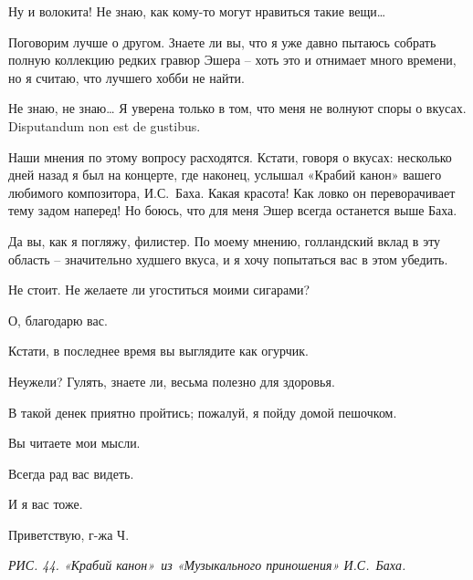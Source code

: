 \documentclass[../main.tex]{subfiles}
\begin{document}
\begin{dialogue}
 Ну и волокита! Не знаю, как кому-то могут нравиться такие вещи\ldots{}

 Поговорим лучше о другом. Знаете ли вы, что я уже давно пытаюсь собрать полную коллекцию редких гравюр Эшера \--- хоть это и отнимает много времени, но я считаю, что лучшего хобби не найти.

 Не знаю, не знаю\ldots{} Я уверена только в том, что меня не волнуют споры о вкусах. Disputandum non est de gustibus.

 Наши мнения по этому вопросу расходятся. Кстати, говоря о вкусах: несколько дней назад я был на концерте, где наконец, услышал «Крабий канон» вашего любимого композитора, И.С.~Баха. Какая красота! Как ловко он переворачивает тему задом наперед! Но боюсь, что для меня Эшер всегда останется выше Баха.

 Да вы, как я погляжу, филистер. По моему мнению, голландский вклад в эту область \--- значительно худшего вкуса, и я хочу попытаться вас в этом убедить.

 Не стоит. Не желаете ли угоститься моими сигарами?

 О, благодарю вас.

 Кстати, в последнее время вы выглядите как огурчик.

 Неужели? Гулять, знаете ли, весьма полезно для здоровья.

 В такой денек приятно пройтись; пожалуй, я пойду домой пешочком.

 Вы читаете мои мысли.

 Всегда рад вас видеть.

 И я вас тоже.

 Приветствую, г-жа Ч.

\emph{РИС. 44. «Крабий канон»~из «Музыкального приношения» И.С.~Баха.}

\end{dialogue}
\end{document}
